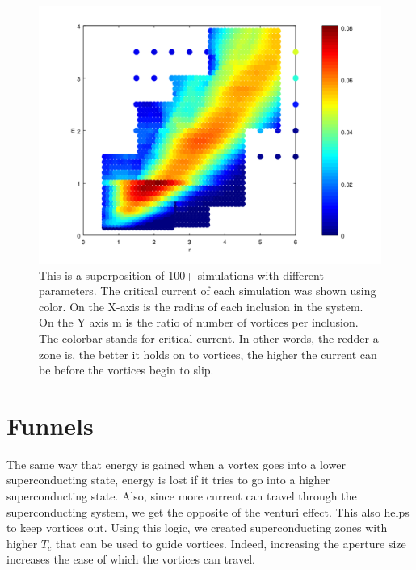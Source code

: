 \begin{figure}[htbp]
\begin{center}
\includegraphics[scale=.50]{HDFinal.png}
\caption{ This is a superposition of 100+ simulations with different parameters. The critical current of each simulation was shown using color. On the X-axis is the radius of each inclusion in the system. On the Y axis m is the ratio of number of vortices per inclusion. The colorbar stands for critical current. In other words, the redder a zone is, the better it holds on to vortices, the higher the current can be before the vortices begin to slip.}
\label{HDF}
\end{center}
\end{figure}

\section{Funnels}
The same way that energy is gained when a vortex goes into a lower superconducting state, energy is lost if it tries to go into a higher superconducting state. Also, since more current can travel through the superconducting system, we get the opposite of the venturi effect. This also helps to keep vortices out. Using this logic, we created superconducting zones with higher $T_c$ that can be used to guide vortices. Indeed, increasing the aperture size increases the ease of which the vortices can travel.

